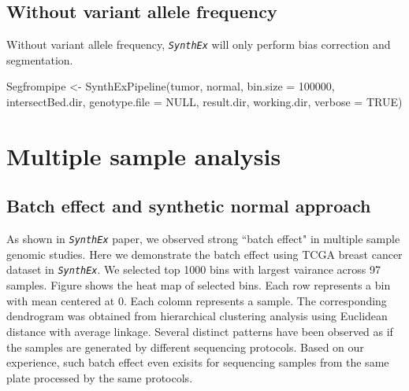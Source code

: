\documentclass{article}
\newcommand{\pkg}[1]{\texttt{\textsl{#1}}}
\begin{document}
\subsection{Without variant allele frequency}
Without variant allele frequency, \pkg{SynthEx} will only perform bias correction and segmentation.

\begin{Schunk}
\begin{Sinput}
 Segfrompipe <- SynthExPipeline(tumor, normal, bin.size = 100000,
                     intersectBed.dir, genotype.file = NULL,
                     result.dir, working.dir, verbose = TRUE)
\end{Sinput}
\end{Schunk}


\section{Multiple sample analysis}
\subsection{Batch effect and synthetic normal approach}
As shown in \pkg{SynthEx} paper, we observed strong ``batch effect" in multiple sample genomic studies. Here we demonstrate the batch effect using TCGA breast cancer dataset in \pkg{SynthEx}.
We selected top 1000 bins with largest vairance across 97 samples. Figure shows the heat map of selected bins. Each row represents a bin with mean centered at 0. Each colomn represents a sample. The corresponding dendrogram was obtained from hierarchical clustering analysis using Euclidean distance with average linkage. Several distinct patterns have been observed as if the samples are generated by different sequencing protocols. Based on our experience, such batch effect even exisits for sequencing samples from the same plate processed by the same protocols.

\begin{Schunk}
\end{Schunk}
\end{document}
